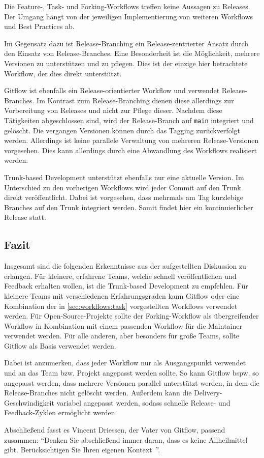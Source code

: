 Die Feature-, Task- und Forking\hyp Workflows treffen keine Aussagen zu Releases. Der Umgang hängt von der jeweiligen Implementierung von weiteren Workflows und Best Practices ab.

Im Gegensatz dazu ist Release\hyp Branching ein Release\hyp zentrierter Ansatz durch den Einsatz von Release\hyp Branches. Eine Besonderheit ist die Möglichkeit, mehrere Versionen zu unterstützen und zu pflegen. Dies ist der einzige hier betrachtete Workflow, der dies direkt unterstützt.

Gitflow ist ebenfalls ein Release\hyp orientierter Workflow und verwendet Release\hyp Branches. Im Kontrast zum Release\hyp Branching dienen diese allerdings zur Vorbereitung von Releases und nicht zur Pflege dieser. Nachdem diese Tätigkeiten abgeschlossen sind, wird der Release\hyp Branch auf \texttt{main} integriert und gelöscht. Die vergangen Versionen können durch das Tagging zurückverfolgt werden. Allerdings ist keine parallele Verwaltung von mehreren Release\hyp Versionen vorgesehen. Dies kann allerdings durch eine Abwandlung des Workflows realisiert werden.

Trunk\hyp based Development unterstützt ebenfalls nur eine aktuelle Version. Im Unterschied zu den vorherigen Workflows wird jeder Commit auf den Trunk direkt veröffentlicht. Dabei ist vorgesehen, dass mehrmals am Tag kurzlebige Branches auf den Trunk integriert werden. Somit findet hier ein kontinuierlicher Release statt.


\subsection{Fazit}

Insgesamt sind die folgenden Erkenntnisse aus der aufgestellten Diskussion zu erlangen. Für kleinere, erfahrene Teams, welche schnell veröffentlichen und Feedback erhalten wollen, ist die Trunk\hyp based Development zu empfehlen. Für kleinere Teams mit verschiedenen Erfahrungsgraden kann Gitflow oder eine Kombination der in \autoref{sec:workflows:task} vorgestellten Workflows verwendet werden. Für Open\hyp Source\hyp Projekte sollte der Forking\hyp Workflow als übergreifender Workflow in Kombination mit einem passenden Workflow für die Maintainer verwendet werden. Für alle anderen, aber besonders für große Teams, sollte Gitflow als Basis verwendet werden.

Dabei ist anzumerken, dass jeder Workflow nur als Ausgangspunkt verwendet und an das Team bzw. Projekt angepasst werden sollte. So kann Gitflow bspw. so angepasst werden, dass mehrere Versionen parallel unterstützt werden, in dem die Release\hyp Branches nicht gelöscht werden. Außerdem kann die Delivery\hyp Geschwindigkeit variabel angepasst werden, sodass schnelle Release- und Feedback\hyp Zyklen ermöglicht werden.

Abschließend fasst es Vincent Driessen, der Vater von Gitflow, passend zusammen: \enquote{Denken Sie abschließend immer daran, dass es keine Allheilmittel gibt. Berücksichtigen Sie Ihren eigenen Kontext~\cite{driessenGitflow2012}}.
